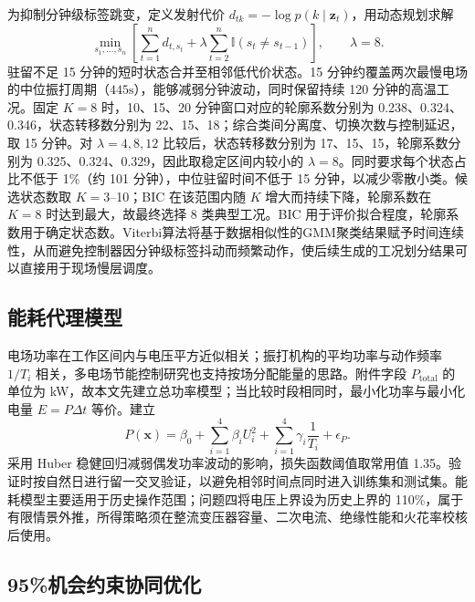 为抑制分钟级标签跳变，定义发射代价 $d_{tk}=-\log p(k\mid\bm z_t)$，用动态规划求解
\begin{equation}
\min_{s_1,\ldots,s_n}\left[\sum_{t=1}^{n}d_{t,s_t}
+\lambda\sum_{t=2}^{n}\mathbb I(s_t\ne s_{t-1})\right],
\qquad \lambda=8.
\label{eq:viterbi}
\end{equation}
驻留不足 15 分钟的短时状态合并至相邻低代价状态。15 分钟约覆盖两次最慢电场的中位振打周期（$445\mathrm s$），能够减弱分钟波动，同时保留持续 120 分钟的高温工况。固定 $K=8$ 时，10、15、20 分钟窗口对应的轮廓系数分别为 0.238、0.324、0.346，状态转移数分别为 22、15、18；综合类间分离度、切换次数与控制延迟，取 15 分钟。对 $\lambda=4,8,12$ 比较后，状态转移数分别为 17、15、15，轮廓系数分别为 0.325、0.324、0.329，因此取稳定区间内较小的 $\lambda=8$。同时要求每个状态占比不低于 1\%（约 101 分钟），中位驻留时间不低于 15 分钟，以减少零散小类。候选状态数取 $K=3$--10；BIC 在该范围内随 $K$ 增大而持续下降，轮廓系数在 $K=8$ 时达到最大，故最终选择 8 类典型工况。BIC 用于评价拟合程度，轮廓系数用于确定状态数。Viterbi算法将基于数据相似性的GMM聚类结果赋予时间连续性，从而避免控制器因分钟级标签抖动而频繁动作，使后续生成的工况划分结果可以直接用于现场慢层调度。

\subsection{能耗代理模型}

电场功率在工作区间内与电压平方近似相关；振打机构的平均功率与动作频率 $1/T_i$ 相关，多电场节能控制研究也支持按场分配能量的思路\cite{li2013ga}。附件字段 $P_{\mathrm{total}}$ 的单位为 kW，故本文先建立总功率模型；当比较时段相同时，最小化功率与最小化电量 $E=P\Delta t$ 等价。建立
\begin{equation}
P(\bm x)=\beta_0+\sum_{i=1}^{4}\beta_iU_i^2
+\sum_{i=1}^{4}\gamma_i\frac{1}{T_i}+\epsilon_P.
\label{eq:power}
\end{equation}
采用 Huber 稳健回归减弱偶发功率波动的影响，损失函数阈值取常用值 1.35。验证时按自然日进行留一交叉验证，以避免相邻时间点同时进入训练集和测试集。能耗模型主要适用于历史操作范围；问题四将电压上界设为历史上界的 110\%，属于有限情景外推，所得策略须在整流变压器容量、二次电流、绝缘性能和火花率校核后使用。

\subsection{95\%机会约束协同优化}

